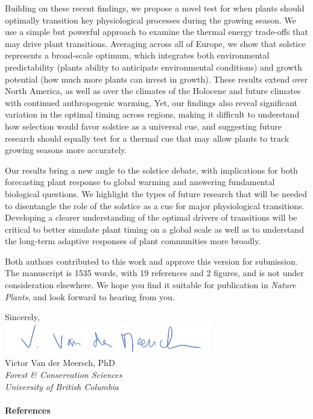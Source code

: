 \documentclass[11pt,a4paper]{article}
\begin{document}
\noindent Building on these recent findings, we propose a novel test for when plants should optimally transition key physiological processes during the growing season. We use a simple but powerful approach to  examine the thermal energy trade-offs that may drive plant transitions. %
Averaging across all of Europe, we show that solstice represents a broad-scale optimum, which integrates both environmental predictability (plants ability to anticipate environmental conditions) and growth potential (how much more plants can invest in growth). These results extend over North America, as well as over the climates of the Holocene and future climates with continued anthropogenic warming, Yet, our findings also reveal significant variation in the optimal timing across regions, making it difficult to understand how selection would favor solstice as a universal cue, and suggesting future research should equally test for a thermal cue that may allow plants to track growing seasons more accurately.

\vspace{0.25cm}

\noindent Our results bring a new angle to the solstice debate, with implications for both forecasting plant response to global warming and answering fundamental biological questions. We highlight the types of future research that will be needed to disentangle the role of the solstice as a cue for major physiological transitions. Developing a clearer understanding of the optimal drivers of transitions will be critical to better simulate plant timing on a global scale as well as to understand the long-term adaptive responses of plant communities more broadly. 

\vspace{0.25cm}

\noindent Both authors contributed to this work and approve this version for submission. The manuscript is 1535 words, with 19 references and 2 figures, and is not under consideration elsewhere. We hope you find it suitable for publication in \emph{Nature Plants}, and look forward to hearing from you. 

\vspace{0.45cm}
\noindent Sincerely, 
\vspace{0.45cm}\\
\hspace*{-0.5cm}
\includegraphics[scale=.65]{sign_long.png} \\
\noindent Victor Van der Meersch, PhD\\
\noindent \emph{Forest \& Conservation Sciences}\\
\noindent \emph{University of British Columbia}

\clearpage

\paragraph{References}
\printbibliography[heading=none]


\newpage
\end{document}
